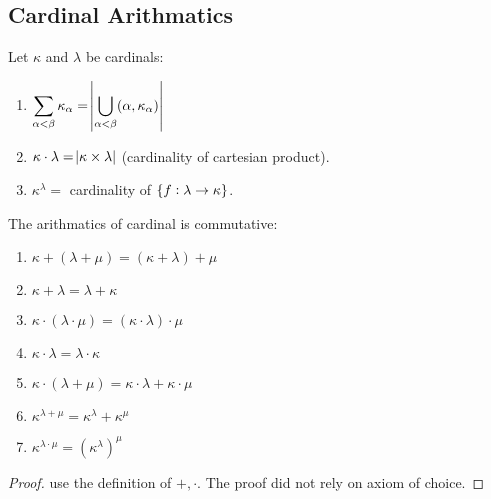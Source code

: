 \subsection{Cardinal Arithmatics}

\begin{definition}
    Let $\kappa$ and $\lambda$ be cardinals:
    \begin{enumerate}
        \item $\displaystyle \sum_{\alpha < \beta} \kappa_\alpha = \abs{\bigcup_{\alpha < \beta} (\alpha, \kappa_\alpha)}$
        \item $\kappa \cdot \lambda = \abs{\kappa \times \lambda}$ (cardinality of cartesian product).
        \item $\kappa^\lambda =$ cardinality of $\set{f: \lambda \rightarrow \kappa}$.
    \end{enumerate}
\end{definition}

\begin{theorem}
    The arithmatics of cardinal is commutative:
    \begin{enumerate}
        \item $\kappa + (\lambda + \mu) = (\kappa + \lambda) + \mu$
        \item $\kappa + \lambda = \lambda + \kappa$
        \item $\kappa \cdot  (\lambda \cdot  \mu) = (\kappa \cdot  \lambda) \cdot  \mu$
        \item $\kappa \cdot  \lambda = \lambda \cdot  \kappa$
        \item $\kappa \cdot  (\lambda + \mu) = \kappa \cdot  \lambda + \kappa \cdot \mu$
        \item $\kappa^{\lambda + \mu} =  \kappa^\lambda +  \kappa^\mu$
        \item $\kappa^{\lambda \cdot  \mu} =  (\kappa^\lambda)^\mu$
    \end{enumerate}
\end{theorem}
\begin{proof}
    use the definition of $+,\cdot$. The proof did not rely on axiom of choice.
\end{proof}

